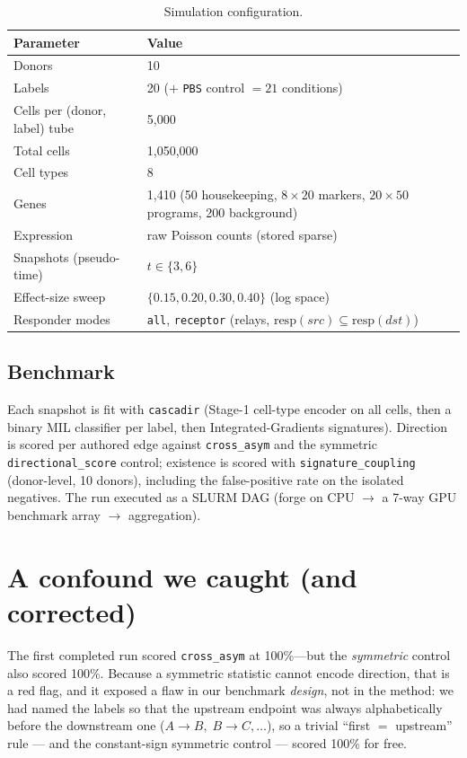 \documentclass[11pt,a4paper]{article}
\begin{document}
\begin{table}[h]
\centering
\caption{Simulation configuration.}
\label{tab:config}
\begin{tabular}{@{}ll@{}}
\toprule
Parameter & Value \\
\midrule
Donors & 10 \\
Labels & 20 ($+$ \texttt{PBS} control $=21$ conditions) \\
Cells per (donor, label) tube & 5{,}000 \\
Total cells & 1{,}050{,}000 \\
Cell types & 8 \\
Genes & 1{,}410 (50 housekeeping, $8\times20$ markers, $20\times50$ programs, 200 background) \\
Expression & raw Poisson counts (stored sparse) \\
Snapshots (pseudo-time) & $t\in\{3,6\}$ \\
Effect-size sweep & $\{0.15,0.20,0.30,0.40\}$ (log space) \\
Responder modes & \texttt{all}, \texttt{receptor} (relays, $\mathrm{resp}(src)\subseteq\mathrm{resp}(dst)$) \\
\bottomrule
\end{tabular}
\end{table}

\subsection{Benchmark}
Each snapshot is fit with \texttt{cascadir} (Stage-1 cell-type encoder on all cells, then a
binary MIL classifier per label, then Integrated-Gradients signatures). Direction is scored
per authored edge against \texttt{cross\_asym} and the symmetric \texttt{directional\_score}
control; existence is scored with \texttt{signature\_coupling} (donor-level, 10 donors),
including the false-positive rate on the isolated negatives. The run executed as a SLURM DAG
(forge on CPU $\to$ a 7-way GPU benchmark array $\to$ aggregation).

\section{A confound we caught (and corrected)}
The first completed run scored \texttt{cross\_asym} at 100\%---but the \emph{symmetric}
control also scored 100\%. Because a symmetric statistic cannot encode direction, that is a
red flag, and it exposed a flaw in our benchmark \emph{design}, not in the method: we had
named the labels so that the upstream endpoint was always alphabetically before the
downstream one ($A\!\to\!B,\;B\!\to\!C,\dots$), so a trivial ``first $=$ upstream'' rule ---
and the constant-sign symmetric control --- scored 100\% for free.
\end{document}

